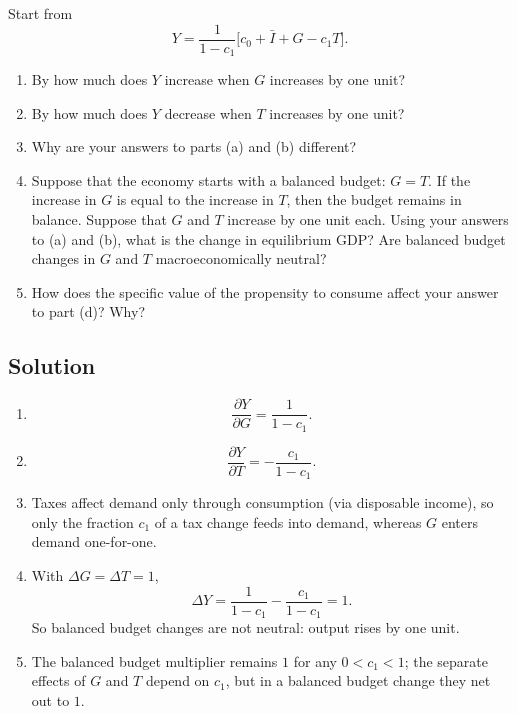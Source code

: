 \documentclass[12pt]{article}
\begin{document}
\medskip

Start from
\[
Y = \frac{1}{1-c_1}\bigl[c_0 + \bar{I} + G - c_1T\bigr].
\]

\begin{enumerate}[label=(\alph*)]
\item By how much does \(Y\) increase when \(G\) increases by one unit?
\item By how much does \(Y\) decrease when \(T\) increases by one unit?
\item Why are your answers to parts (a) and (b) different?
\item Suppose that the economy starts with a balanced budget: \(G = T\). If the increase in \(G\) is equal to the increase in \(T\), then the budget remains in balance. Suppose that \(G\) and \(T\) increase by one unit each. Using your answers to (a) and (b), what is the change in equilibrium GDP? Are balanced budget changes in \(G\) and \(T\) macroeconomically neutral?
\item How does the specific value of the propensity to consume affect your answer to part (d)? Why?
\end{enumerate}

\subsection*{Solution}

\begin{enumerate}[label=(\alph*)]
\item
\[
\frac{\partial Y}{\partial G}=\frac{1}{1-c_1}.
\]

\item
\[
\frac{\partial Y}{\partial T}=-\frac{c_1}{1-c_1}.
\]

\item Taxes affect demand only through consumption (via disposable income), so only the fraction \(c_1\) of a tax change feeds into demand, whereas \(G\) enters demand one-for-one.

\item With \(\Delta G=\Delta T=1\),
\[
\Delta Y=\frac{1}{1-c_1}-\frac{c_1}{1-c_1}=1.
\]
So balanced budget changes are not neutral: output rises by one unit.

\item The balanced budget multiplier remains \(1\) for any \(0<c_1<1\); the separate effects of \(G\) and \(T\) depend on \(c_1\), but in a balanced budget change they net out to \(1\).
\end{enumerate}
\end{document}
